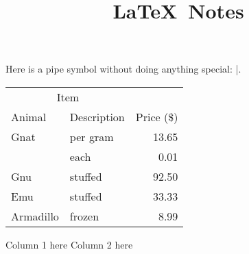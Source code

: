 \documentclass{article}
\title{\LaTeX~Notes}
\author{}
\date{}
\begin{document}
\doublespacing

\maketitle

\tableofcontents

\linenumbers

Here is a pipe symbol without doing anything special: |.

\begin{tabular}{llr}
  \toprule
  \multicolumn{2}{c}{Item} \\
  \cmidrule(r){1-2} %
    Animal    & Description & Price (\$) \\
    \midrule
    Gnat      & per gram    & 13.65      \\
              & each        & 0.01       \\
    Gnu       & stuffed     & 92.50      \\
    Emu       & stuffed     & 33.33      \\
    Armadillo & frozen      & 8.99       \\
  \bottomrule
\end{tabular}






\begin{multicols}{2}
  Column 1 here
  \columnbreak
  Column 2 here
\end{multicols}

\end{document}
